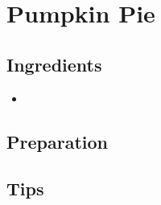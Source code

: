 \thispagestyle{fancy}
\section{Pumpkin Pie} \label{pumpkinpie}
\AddToShipoutPicture*{\PumpkinPie}


\subsection*{Ingredients}

\begin{multicols}{3}
	\begin{itemize}
		\item 
	\end{itemize}
\end{multicols}

\subsection*{Preparation}


\subsection*{Tips}